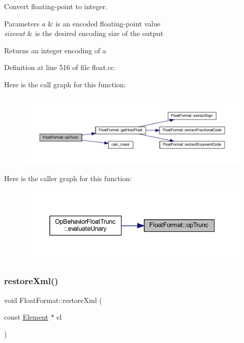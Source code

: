 Convert floating-\/point to integer. 


\begin{DoxyParams}{Parameters}
{\em a} & is an encoded floating-\/point value \\
\hline
{\em sizeout} & is the desired encoding size of the output \\
\hline
\end{DoxyParams}
\begin{DoxyReturn}{Returns}
an integer encoding of a 
\end{DoxyReturn}


Definition at line 516 of file float.\+cc.

Here is the call graph for this function\+:
\nopagebreak
\begin{figure}[H]
\begin{center}
\leavevmode
\includegraphics[width=350pt]{class_float_format_a97577950c7ef0b53099d17deee29f198_cgraph}
\end{center}
\end{figure}
Here is the caller graph for this function\+:
\nopagebreak
\begin{figure}[H]
\begin{center}
\leavevmode
\includegraphics[width=338pt]{class_float_format_a97577950c7ef0b53099d17deee29f198_icgraph}
\end{center}
\end{figure}
\mbox{\label{class_float_format_aa6e0b189a1a66251b200fcf829d98356}} 
\subsubsection{\texorpdfstring{restoreXml()}{restoreXml()}}
{\footnotesize\ttfamily void Float\+Format\+::restore\+Xml (\begin{DoxyParamCaption}\item[{const \mbox{\hyperlink{class_element}{Element}} $\ast$}]{el }\end{DoxyParamCaption})}



